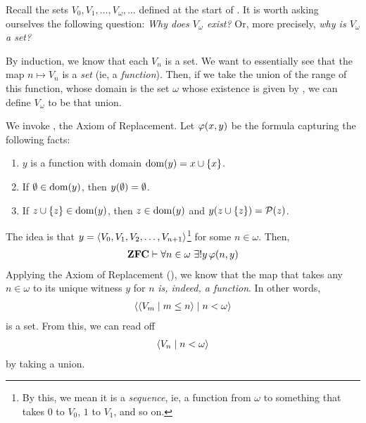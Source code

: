 Recall the sets $V_0, V_1, \ldots, V_\omega, \ldots$ defined at the start of . It is worth asking ourselves the following question: \textit{Why does $V_{\omega}$ exist?} Or, more precisely, \textit{why is $V_{\omega}$ a set?}

By induction, we know that each $V_n$ is a set. We want to essentially see that the map $n \mapsto V_n$ is a \textit{set} (ie, a \textit{function}). Then, if we take the union of the range of this function, whose domain is the set $\omega$ whose existence is given by , we can define $V_{\omega}$ to be that union.

We invoke , the Axiom of Replacement. Let $\varphi\!\left( x, y \right)$ be the formula capturing the following facts:
\begin{enumerate}
    \item $y$ is a function with domain $\operatorname{dom}\!\left( y \right) = x \cup \left\{ x \right\}$.
    \item If $\emptyset \in \operatorname{dom}\!\left( y \right)$, then $y\!\left( \emptyset \right) = \emptyset$.
    \item If $z \cup \left\{ z \right\} \in \operatorname{dom}\!\left( y \right)$, then $z \in \operatorname{dom}\!\left( y \right)$ and $y\!\left( z \cup \left\{ z \right\} \right) = \mathcal{P}\!\left( z \right)$.
\end{enumerate}
The idea is that $y = \left\langle V_0, V_1, V_2, \ldots, V_{n+1} \right\rangle$\footnote{By this, we mean it is a \textit{sequence}, ie, a function from $\omega$ to something that takes $0$ to $V_{0}$, $1$ to $V_{1}$, and so on.} for some $n \in \omega$. Then,
\begin{align*}
    \mathbf{ZFC} \vdash \forall n \in \omega \ \exists! y \, \varphi\!\left( n, y \right)
\end{align*}
Applying the Axiom of Replacement (), we know that the map that takes any $n \in \omega$ to its unique witness $y$ for $n$ \textit{is, indeed, a function}. In other words,
\begin{align*}
    \left\langle \left\langle V_m \; \middle| \; m \leq n \right\rangle \; \middle| \; n < \omega \right\rangle
\end{align*}
is a set. From this, we can read off
\begin{align*}
    \left\langle V_n \; \middle| \; n < \omega \right\rangle
\end{align*}
by taking a union. %

